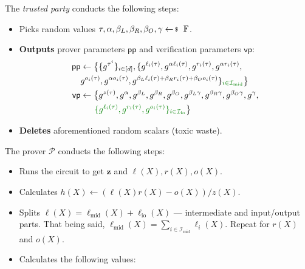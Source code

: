 \documentclass[../lecture-notes-148x210.tex]{subfiles}
\begin{document}
\begin{tcolorbox}
    The \emph{trusted party} conducts the following steps:
    \begin{itemize}[label=]
        \item Picks random values $\tau, \alpha, \beta_L, \beta_R, \beta_O, \gamma \leftarrowS \mathbb{F}$.
        \item \textbf{Outputs} prover parameters $\mathsf{pp}$ and verification parameters $\mathsf{vp}$:
        \begin{equation*}        
            \begin{aligned}
                \mathsf{pp} & \gets \big\{\{g^{\tau^i}\}_{i \in [d]}, \{g^{\ell_i(\tau)}, g^{\alpha \ell_i(\tau)}, g^{r_i(\tau)}, g^{\alpha r_i(\tau)}, \\ 
                            & g^{o_i(\tau)}, g^{\alpha o_i(\tau)}, g^{\beta_L\ell_i(\tau)+\beta_Rr_i(\tau)+\beta_Oo_i(\tau)}\}_{\textcolor{green!50!black}{i \in \mathcal{I}_{\text{mid}}}}\big\} \\
                \mathsf{vp} & \gets \big\{ g^{z(\tau)}, g^{\alpha}, g^{\beta_L}, g^{\beta_R}, g^{\beta_O}, g^{\beta_L\gamma}, g^{\beta_R\gamma}, g^{\beta_O\gamma}, g^{\gamma}, \\
                            & \;\;\;\;\;\; \textcolor{green!50!black}{ \{g^{\ell_i(\tau)}, g^{r_i(\tau)}, g^{o_i(\tau)}\}_{i \in \mathcal{I}_{\text{io}}} } \big\}
            \end{aligned}
        \end{equation*}
    \item \textbf{Deletes} aforementioned random scalars (toxic waste).
    \end{itemize}
    The prover $\mathcal{P}$ conducts the following steps:
    \begin{itemize}[label=]
        \item Runs the circuit to get $\mathbf{z}$ and $\ell(X),r(X),o(X)$.
        \item Calculates $h(X) \gets (\ell(X)r(X) - o(X))\big/ z(X)$.
        \item \textcolor{green!50!black}{Splits $\ell(X) = \ell_{\text{mid}}(X) + \ell_{\text{io}}(X)$ --- intermediate and input/output parts. That being said, $\ell_{\text{mid}}(X) = \sum_{i \in \mathcal{I}_{\text{mid}}}\ell_i(X)$. Repeat for $r(X)$ and $o(X)$.}
        \item Calculates the following values: 
        \begin{align*}

\end{align*}
\end{itemize}
\end{tcolorbox}
\end{document}
